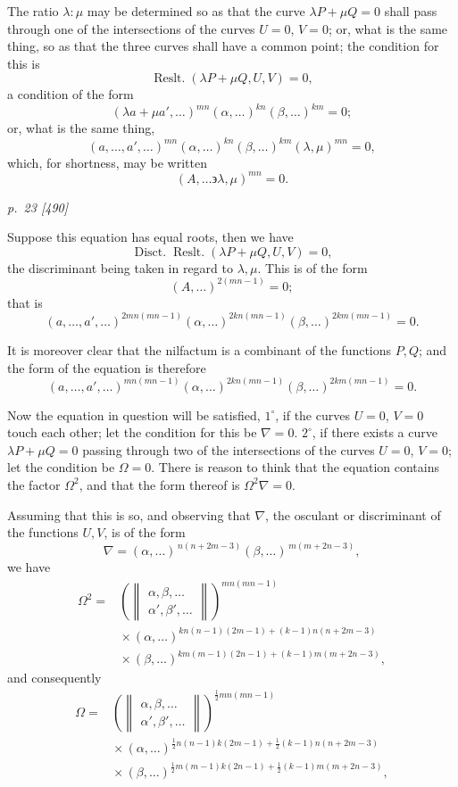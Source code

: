 ﻿\documentclass[11pt,a4paper]{article}
\theoremstyle{plain}
\theoremstyle{definition}
\newcommand{\eps}{\backepsilon}
\newcommand{\tworowcomb}[2]{%
  \left(\begin{Vmatrix}#1\\#2\end{Vmatrix}\right)}
\begin{document}
The ratio \(\lambda:\mu\) may be determined so as that the curve
\(\lambda P+\mu Q=0\) shall pass through one of the intersections of the
curves \(U=0\), \(V=0\); or, what is the same thing, so as that the three
curves shall have a common point; the condition for this is
\[
\operatorname{Reslt.}(\lambda P+\mu Q,U,V)=0,
\]
a condition of the form
\[
(\lambda a+\mu a',\ldots)^{mn}(\alpha,\ldots)^{kn}(\beta,\ldots)^{km}=0;
\]
or, what is the same thing,
\[
(a,\ldots,a',\ldots)^{mn}(\alpha,\ldots)^{kn}(\beta,\ldots)^{km}
(\lambda,\mu)^{mn}=0,
\]
which, for shortness, may be written
\[
(A,\ldots \eps \lambda,\mu)^{mn}=0.
\]

\clearpage
\textit{p.~23 [490]}

Suppose this equation has equal roots, then we have
\[
\operatorname{Disct.}\operatorname{Reslt.}(\lambda P+\mu Q,U,V)=0,
\]
the discriminant being taken in regard to \(\lambda,\mu\). This is of the
form
\[
(A,\ldots)^{2(mn-1)}=0;
\]
that is
\[
(a,\ldots,a',\ldots)^{2mn(mn-1)}
(\alpha,\ldots)^{2kn(mn-1)}
(\beta,\ldots)^{2km(mn-1)}=0.
\]

It is moreover clear that the nilfactum is a combinant of the functions
\(P,Q\); and the form of the equation is therefore
\[
(a,\ldots,a',\ldots)^{mn(mn-1)}
(\alpha,\ldots)^{2kn(mn-1)}
(\beta,\ldots)^{2km(mn-1)}=0.
\]

Now the equation in question will be satisfied, \(1^\circ\), if the curves
\(U=0\), \(V=0\) touch each other; let the condition for this be \(\nabla=0\).
\(2^\circ\), if there exists a curve \(\lambda P+\mu Q=0\) passing through
two of the intersections of the curves \(U=0\), \(V=0\); let the condition
be \(\Omega=0\). There is reason to think that the equation contains the
factor \(\Omega^2\), and that the form thereof is \(\Omega^2\nabla=0\).

Assuming that this is so, and observing that \(\nabla\), the osculant or
discriminant of the functions \(U,V\), is of the form
\[
\nabla=(\alpha,\ldots)^{\,n(n+2m-3)}
(\beta,\ldots)^{\,m(m+2n-3)},
\]
we have
\[
\begin{aligned}
\Omega^2={}&
\tworowcomb{\alpha,\beta,\ldots}{\alpha',\beta',\ldots}^{mn(mn-1)}\\
&{}\times
(\alpha,\ldots)^{kn(n-1)(2m-1)+(k-1)n(n+2m-3)}\\
&{}\times
(\beta,\ldots)^{km(m-1)(2n-1)+(k-1)m(m+2n-3)},
\end{aligned}
\]
and consequently
\[
\begin{aligned}
\Omega={}&
\tworowcomb{\alpha,\beta,\ldots}{\alpha',\beta',\ldots}^{\frac12 mn(mn-1)}\\
&{}\times
(\alpha,\ldots)^{\frac12 n(n-1)k(2m-1)+\frac12(k-1)n(n+2m-3)}\\
&{}\times
(\beta,\ldots)^{\frac12 m(m-1)k(2n-1)+\frac12(k-1)m(m+2n-3)},
\end{aligned}
\]
\end{document}

